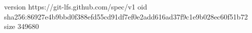 version https://git-lfs.github.com/spec/v1
oid sha256:86927e4b9bbd0f388efd55cd91df7ef0e2add616ad37f9c1e9b028ec60f51b72
size 349680
